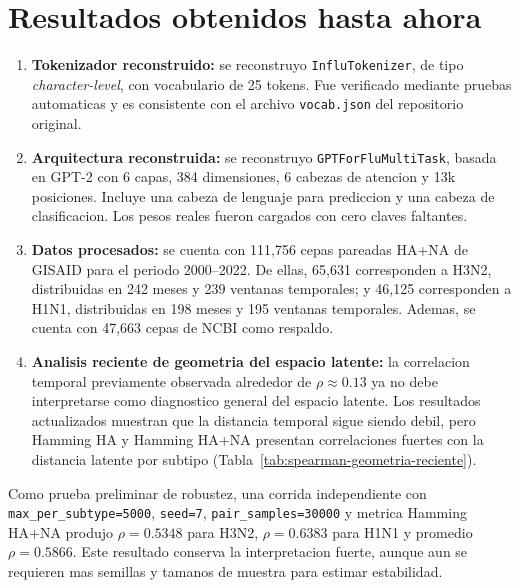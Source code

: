 \documentclass[12pt,letterpaper]{article}
\begin{document}
\section{Resultados obtenidos hasta ahora}

\begin{enumerate}[label=\textbf{\arabic*.}, leftmargin=2.2em]
    \item \textbf{Tokenizador reconstruido:} se reconstruyo \texttt{InfluTokenizer}, de tipo \emph{character-level}, con vocabulario de 25 tokens. Fue verificado mediante pruebas automaticas y es consistente con el archivo \texttt{vocab.json} del repositorio original.

    \item \textbf{Arquitectura reconstruida:} se reconstruyo \texttt{GPTForFluMultiTask}, basada en GPT-2 con 6 capas, 384 dimensiones, 6 cabezas de atencion y 13k posiciones. Incluye una cabeza de lenguaje para prediccion y una cabeza de clasificacion. Los pesos reales fueron cargados con cero claves faltantes.

    \item \textbf{Datos procesados:} se cuenta con 111,756 cepas pareadas HA+NA de GISAID para el periodo 2000--2022. De ellas, 65,631 corresponden a H3N2, distribuidas en 242 meses y 239 ventanas temporales; y 46,125 corresponden a H1N1, distribuidas en 198 meses y 195 ventanas temporales. Ademas, se cuenta con 47,663 cepas de NCBI como respaldo.

    \item \textbf{Analisis reciente de geometria del espacio latente:} la correlacion temporal previamente observada alrededor de $\rho \approx 0.13$ ya no debe interpretarse como diagnostico general del espacio latente. Los resultados actualizados muestran que la distancia temporal sigue siendo debil, pero Hamming HA y Hamming HA+NA presentan correlaciones fuertes con la distancia latente por subtipo (Tabla~\ref{tab:spearman-geometria-reciente}).
\end{enumerate}

Como prueba preliminar de robustez, una corrida independiente con \texttt{max\_per\_subtype=5000}, \texttt{seed=7}, \texttt{pair\_samples=30000} y metrica Hamming HA+NA produjo $\rho=0.5348$ para H3N2, $\rho=0.6383$ para H1N1 y promedio $\rho=0.5866$. Este resultado conserva la interpretacion fuerte, aunque aun se requieren mas semillas y tamanos de muestra para estimar estabilidad.
\end{document}
